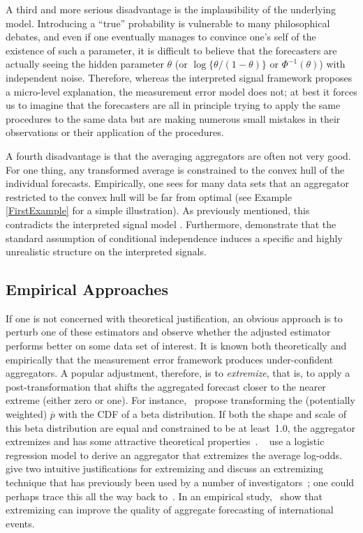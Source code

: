 \documentclass[11pt]{article}
\theoremstyle{definition}
\theoremstyle{definition}
\def\pb{\overline{p}}
\begin{document}
A third and more serious disadvantage is the implausibility of the
underlying model. Introducing a ``true'' probability is vulnerable to
many philosophical debates, and even if one eventually manages to
convince one's self of the existence of such a parameter, it is
difficult to believe that the forecasters are actually seeing the
hidden parameter $\theta$ (or $\log\{\theta/(1-\theta)\}$ or
$\Phi^{-1}(\theta)$) with independent noise. Therefore, whereas the
interpreted signal framework proposes a micro-level explanation, the
measurement error model does not; at best it forces us to imagine that
the forecasters are all in principle trying to apply the same
procedures to the same data but are making numerous small mistakes in
their observations or their application of the procedures.

A fourth disadvantage is that the averaging aggregators are often not
very good. For one thing, any transformed average is constrained to
the convex hull of the individual forecasts.  Empirically, one sees
for many data sets that an aggregator restricted to the convex hull
will be far from optimal (see Example \ref{FirstExample} for a simple
illustration).  As previously mentioned, this contradicts the
interpreted signal model \cite{parunak2013characterizing}.
Furthermore, \cite{hong2009interpreted} demonstrate that the standard
assumption of conditional independence induces a specific and highly
unrealistic structure on the interpreted signals.

\subsection{Empirical Approaches}
\label{ss:empirical}

If one is not concerned with theoretical justification, an obvious
approach is to perturb one of these estimators and observe whether the
adjusted estimator performs better on some data set of interest.  It
is known both theoretically and empirically that the measurement error
framework produces under-confident aggregators.  A popular adjustment,
therefore, is to {\em extremize}, that is, to apply a
post-transformation that shifts the aggregated forecast closer to the
nearer extreme (either zero or one).  For instance,~\citet{Ranjan08}
propose transforming the (potentially weighted) $\pb$ with the CDF of a
beta distribution.  If both the shape and scale of this beta
distribution are equal and constrained to be at least~1.0, the
aggregator extremizes and has some attractive theoretical
properties~\citep{Wallsten2001}.  ~\citet{satopaa} use a logistic
regression model to derive an aggregator that extremizes the average
log-odds.  ~\citet{baron2014two} give two intuitive justifications for
extremizing and discuss an extremizing technique that has previously
been used by a number of investigators~\citep{Erev1994,
shlomi2010subjective}; one could perhaps trace this all the way back
to~\citet{karmarkar1978subjectively}.  In an empirical
study,~\citet{mellers2014psychological} show that extremizing can
improve the quality of aggregate forecasting of international events.
\end{document}
